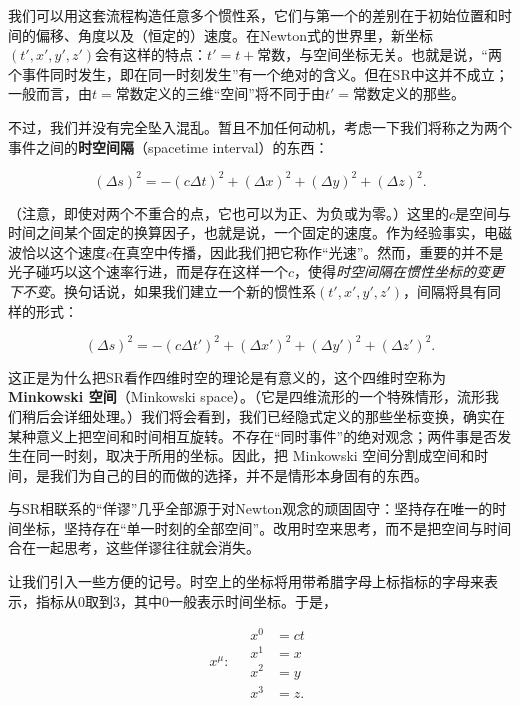 我们可以用这套流程构造任意多个惯性系，它们与第一个的差别在于初始位置和时间的偏移、角度以及（恒定的）速度。在Newton式的世界里，新坐标$(t',x',y',z')$会有这样的特点：$t'=t+\text{常数}$，与空间坐标无关。也就是说，“两个事件同时发生，即在同一时刻发生”有一个绝对的含义。但在SR中这并不成立；一般而言，由$t=\text{常数}$定义的三维“空间”将不同于由$t'=\text{常数}$定义的那些。

不过，我们并没有完全坠入混乱。暂且不加任何动机，考虑一下我们将称之为两个事件之间的\textbf{时空间隔}（spacetime interval）的东西：

\begin{equation*}
\boxed{(\Delta s)^2 = -(c\Delta t)^2 + (\Delta x)^2 + (\Delta y)^2 + (\Delta z)^2.}
\tag{1.10}
\end{equation*}

（注意，即使对两个不重合的点，它也可以为正、为负或为零。）这里的$c$是空间与时间之间某个固定的换算因子，也就是说，一个固定的速度。作为经验事实，电磁波恰以这个速度$c$在真空中传播，因此我们把它称作“光速”。然而，重要的并不是光子碰巧以这个速率行进，而是存在这样一个$c$，使得\emph{时空间隔在惯性坐标的变更下不变}。换句话说，如果我们建立一个新的惯性系$(t',x',y',z')$，间隔将具有同样的形式：

\begin{equation*}
(\Delta s)^2 = -(c\Delta t')^2 + (\Delta x')^2 + (\Delta y')^2 + (\Delta z')^2.
\tag{1.11}
\end{equation*}

这正是为什么把SR看作四维时空的理论是有意义的，这个四维时空称为\textbf{Minkowski 空间}（Minkowski space）。（它是四维流形的一个特殊情形，流形我们稍后会详细处理。）我们将会看到，我们已经隐式定义的那些坐标变换，确实在某种意义上把空间和时间相互旋转。不存在“同时事件”的绝对观念；两件事是否发生在同一时刻，取决于所用的坐标。因此，把 Minkowski 空间分割成空间和时间，是我们为自己的目的而做的选择，并不是情形本身固有的东西。

与SR相联系的“佯谬”几乎全部源于对Newton观念的顽固固守：坚持存在唯一的时间坐标，坚持存在“单一时刻的全部空间”。改用时空来思考，而不是把空间与时间合在一起思考，这些佯谬往往就会消失。

让我们引入一些方便的记号。时空上的坐标将用带希腊字母上标指标的字母来表示，指标从0取到3，其中0一般表示时间坐标。于是，

\begin{equation*}
x^{\mu}:\quad
\begin{aligned}
x^0 &= ct \\
x^1 &= x \\
x^2 &= y \\
x^3 &= z.
\end{aligned}
\tag{1.12}
\end{equation*}

